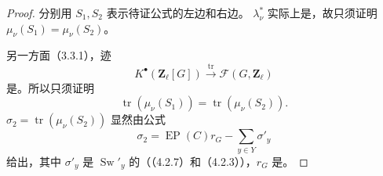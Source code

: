 \begin{proof}
分别用 $S_1,S_2$ 表示待证公式的左边和右边。 $\lambda_\nu^*$ 实际上是，故只须证明 $\mu_\nu(S_1)=\mu_\nu(S_2)$。

另一方面（3.3.1），迹
\[
K^\bullet(\mathbf Z_\ell[G])\xrightarrow{\operatorname{tr}}\mathscr F(G,\mathbf Z_\ell)
\]
是。所以只须证明
\[
\operatorname{tr}(\mu_\nu(S_1))=\operatorname{tr}(\mu_\nu(S_2)).
\]
 $\sigma_2=\operatorname{tr}(\mu_\nu(S_2))$ 显然由公式
\[
\sigma_2=\operatorname{EP}(C)r_G-\sum_{y\in Y}\sigma'_y\tag{5.2.1}
\]
给出，其中 $\sigma'_y$ 是 $\operatorname{Sw}'_y$ 的（（4.2.7）和（4.2.3）），$r_G$ 是。


\end{proof}
